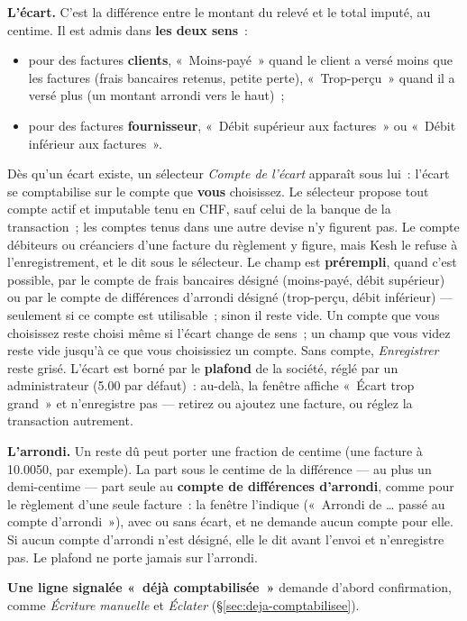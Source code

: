 \documentclass[a4paper,11pt,oneside]{article}
\begin{document}
\textbf{L'écart.} C'est la différence entre le montant du relevé et le total imputé, au centime. Il est admis dans \textbf{les deux sens}~:
\begin{itemize}
    \item pour des factures \textbf{clients}, «~Moins-payé~» quand le client a versé moins que les factures (frais bancaires retenus, petite perte), «~Trop-perçu~» quand il a versé plus (un montant arrondi vers le haut)~;
    \item pour des factures \textbf{fournisseur}, «~Débit supérieur aux factures~» ou «~Débit inférieur aux factures~».
\end{itemize}
Dès qu'un écart existe, un sélecteur \emph{Compte de l'écart} apparaît sous lui~: l'écart se comptabilise sur le compte que \textbf{vous} choisissez. Le sélecteur propose tout compte actif et imputable tenu en CHF, sauf celui de la banque de la transaction~; les comptes tenus dans une autre devise n'y figurent pas. Le compte débiteurs ou créanciers d'une facture du règlement y figure, mais Kesh le refuse à l'enregistrement, et le dit sous le sélecteur. Le champ est \textbf{prérempli}, quand c'est possible, par le compte de frais bancaires désigné (moins-payé, débit supérieur) ou par le compte de différences d'arrondi désigné (trop-perçu, débit inférieur) --- seulement si ce compte est utilisable~; sinon il reste vide. Un compte que vous choisissez reste choisi même si l'écart change de sens~; un champ que vous videz reste vide jusqu'à ce que vous choisissiez un compte. Sans compte, \emph{Enregistrer} reste grisé. L'écart est borné par le \textbf{plafond} de la société, réglé par un administrateur (5.00 par défaut)~: au-delà, la fenêtre affiche «~Écart trop grand~» et n'enregistre pas --- retirez ou ajoutez une facture, ou réglez la transaction autrement.

\textbf{L'arrondi.} Un reste dû peut porter une fraction de centime (une facture à 10.0050, par exemple). La part sous le centime de la différence --- au plus un demi-centime --- part seule au \textbf{compte de différences d'arrondi}, comme pour le règlement d'une seule facture~: la fenêtre l'indique («~Arrondi de \ldots{} passé au compte d'arrondi~»), avec ou sans écart, et ne demande aucun compte pour elle. Si aucun compte d'arrondi n'est désigné, elle le dit avant l'envoi et n'enregistre pas. Le plafond ne porte jamais sur l'arrondi.

\textbf{Une ligne signalée «~déjà comptabilisée~»} demande d'abord confirmation, comme \emph{Écriture manuelle} et \emph{Éclater} (\S\ref{sec:deja-comptabilisee}).
\end{document}
